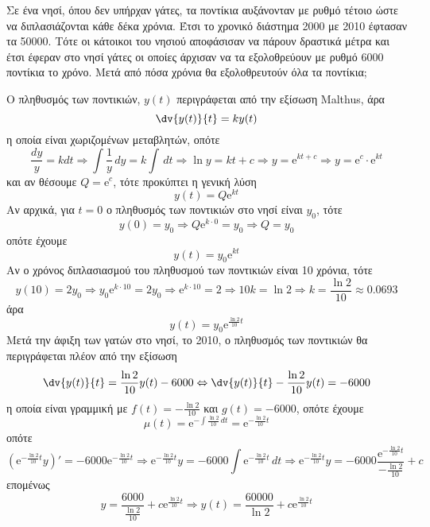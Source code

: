 \begin{myboxs1}
\begin{problem}
  Σε ένα νησί, όπου δεν υπήρχαν γάτες, τα ποντίκια αυξάνονταν με ρυθμό τέτοιο ώστε 
  να διπλασιάζονται κάθε δέκα χρόνια. Έτσι το χρονικό διάστημα 2000 με 2010 έφτασαν τα
  50000. Τότε οι κάτοικοι του νησιού αποφάσισαν να πάρουν δραστικά μέτρα και έτσι 
  έφεραν στο νησί γάτες οι οποίες άρχισαν να τα εξολοθρεύουν με ρυθμό 6000 ποντίκια το 
  χρόνο. Μετά από πόσα χρόνια θα εξολοθρευτούν όλα τα ποντίκια;
\end{problem}
\end{myboxs1}
\begin{solution}
  Ο πληθυσμός των ποντικιών, $y(t)$ περιγράφεται από την εξίσωση Malthus, άρα 
  \[
    \dv{y(t)}{t} = k y(t) 
  \]
  η οποία είναι χωριζομένων μεταβλητών, οπότε
  \[
    \frac{dy}{y} = k dt \Rightarrow \int \frac{1}{y} \,{dy} = k \int \,{dt} \Rightarrow
    \ln{y} = k t + c \Rightarrow y = \mathrm{e}^{kt+c} \Rightarrow y = \mathrm{e}^{c} 
    \cdot \mathrm{e}^{kt}  
  \] 
  και αν θέσουμε $ Q = \mathrm{e}^{c} $, τότε προκύπτει η γενική λύση 
  \[
    y(t) = Q \mathrm{e}^{kt} 
  \]
  Αν αρχικά, για $ t=0 $ ο πληθυσμός των ποντικιών στο νησί είναι $ y_{0} $, τότε 
  \[
    y(0)= y_{0} \Rightarrow Q \mathrm{e}^{k \cdot 0} = y_{0} \Rightarrow Q = y_{0} 
  \] 
  οπότε έχουμε
  \[
    y(t) = y_{0} \mathrm{e}^{kt} 
  \] 
  Αν ο χρόνος διπλασιασμού του πληθυσμού των ποντικιών είναι 10 χρόνια, τότε
  \[
    y(10) = 2 y_{0} \Rightarrow y_{0} \mathrm{e}^{k \cdot 10} = 2 y_{0} \Rightarrow 
    \mathrm{e}^{k \cdot 10} = 2 \Rightarrow 10 k = \ln{2} \Rightarrow k 
    = \frac{\ln 2}{10} \approx 0.0693 
  \] 
  άρα 
  \[
    y(t) = y_{0} \mathrm{e}^{\frac{\ln{2}}{10} t}  
  \] 
  Μετά την άφιξη των γατών στο νησί, το 2010, ο πληθυσμός των ποντικιών θα 
  περιγράφεται πλέον από την εξίσωση 
  \[
    \dv{y(t)}{t} = \frac{\ln{2}}{10}y(t) - 6000 \Leftrightarrow \dv{y(t)}{t} -
    \frac{\ln{2}}{10}y(t) = -6000
  \] 
  η οποία είναι γραμμική με $ f(t) = - \frac{\ln{2}}{10} $ και $ g(t) = -6000 $, 
  οπότε έχουμε
  \[
    \mu (t) = \mathrm{e}^{- \int \frac{\ln{2}}{10} \,{dt}} = 
    \mathrm{e}^{- \frac{\ln{2}}{10} t} 
  \]
  οπότε
  \[
    \left( \mathrm{e}^{- \frac{\ln{2}}{10} t} y \right)' = 
    -6000 \mathrm{e}^{- \frac{\ln{2}}{10} t} \Rightarrow 
    \mathrm{e}^{- \frac{\ln{2}}{10} t} y = - 6000 \int \mathrm{e}^{- \frac{\ln{2}}{10}t}
    \,{dt} \Rightarrow \mathrm{e}^{- \frac{\ln{2}}{10} t} y = -6000
    \frac{\mathrm{e}^{-\frac{\ln{2}}{10} t} }{- \frac{\ln{2}}{10}} + c
  \] 
  επομένως
  \[
    y = \frac{6000}{\frac{\ln{2}}{10}} + c \mathrm{e}^{\frac{\ln{2}}{10} t} \Rightarrow 
    y(t) = \frac{60000}{\ln 2} + c \mathrm{e}^{\frac{\ln{2}}{10} t} 
  \] 


\end{solution}
